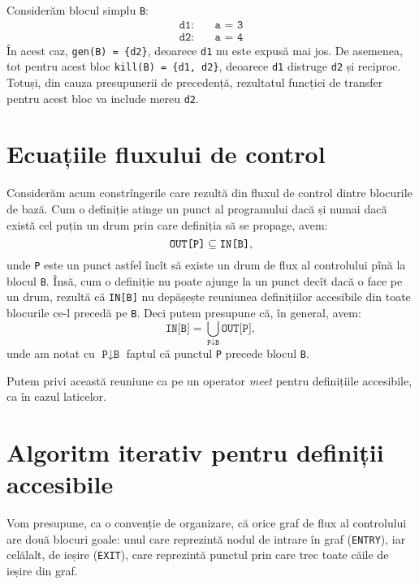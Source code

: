 \begin{example}\label{exm:gen-kill}
    Considerăm blocul simplu \texttt{B}:
    \begin{align*}
        \texttt{d1:} \quad & \texttt{a = 3} \\
        \texttt{d2:} \quad & \texttt{a = 4}
    \end{align*}
    În acest caz, \texttt{gen(B) = \{d2\}}, deoarece \texttt{d1} nu este expusă
    mai jos. De asemenea, tot pentru acest bloc \texttt{kill(B) = \{d1, d2\}}, deoarece \texttt{d1}
    distruge \texttt{d2} și reciproc. Totuși, din cauza presupunerii de precedență,
    rezultatul funcției de transfer pentru acest bloc va include mereu \texttt{d2}.
\end{example}


\section{Ecuațiile fluxului de control}

Considerăm acum constrîngerile care rezultă din fluxul de control dintre
blocurile de bază. Cum o definiție atinge un punct al programului dacă și numai
dacă există cel puțin un drum prin care definiția să se propage, avem:
\[
    \texttt{OUT[P]} \subseteq \texttt{IN[B]},
\]
unde \texttt{P} este un punct astfel încît să existe un drum de flux al
controlului pînă la blocul \texttt{B}. Însă, cum o definiție nu poate ajunge la
un punct decît dacă o face pe un drum, rezultă că \texttt{IN[B]} nu
depășește reuniunea definițiilor accesibile din toate blocurile ce-l
precedă pe \texttt{B}. Deci putem presupune că, în general, avem:
\[
    \texttt{IN[B]} = \bigcup_{\texttt{P} \downarrow \texttt{B}} \texttt{OUT[P]},
\]
unde am notat cu $ \texttt{P} \downarrow \texttt{B} $ faptul că punctul \texttt{P}
precede blocul \texttt{B}.

Putem privi această reuniune ca pe un operator \emph{meet} pentru
definițiile accesibile, ca în cazul laticelor.

\section{Algoritm iterativ pentru definiții accesibile}

Vom presupune, ca o convenție de organizare, că orice graf de flux al
controlului are două blocuri goale: unul care reprezintă nodul de intrare
în graf (\texttt{ENTRY}), iar celălalt, de ieșire (\texttt{EXIT}), care reprezintă
punctul prin care trec toate căile de ieșire din graf.

